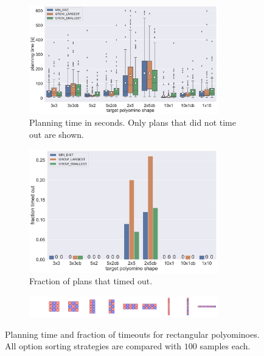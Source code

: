 \begin{figure}
	\centering
	\begin{subfigure}[b]{\textwidth}
		\centering
		\includegraphics[width=0.9\textwidth]{figures/plots/AFTS_cb_time.pdf}
		\caption{Planning time in seconds. Only plans that did not time out are shown.}
		\label{fig:AFTS_cb_time}
	\end{subfigure}
	\begin{subfigure}[b]{\textwidth}
		\centering
		\includegraphics[width=0.9\textwidth]{figures/plots/AFTS_cb_timeout.pdf}
		\caption{Fraction of plans that timed out.}
		\label{fig:AFTS_cb_timeout}
	\end{subfigure}
	\begin{subfigure}[b]{\textwidth}
		\centering
		\includegraphics[width=0.9\textwidth]{figures/AFTS_cb_shapes_small.pdf}
	\end{subfigure}
	\caption[Planning time and fraction of timeouts for rectangular polyominoes]{Planning time and fraction of timeouts for rectangular polyominoes. All option sorting strategies are compared with $100$ samples each.}
	\label{fig:AFTS_cb_timestats}
\end{figure}

